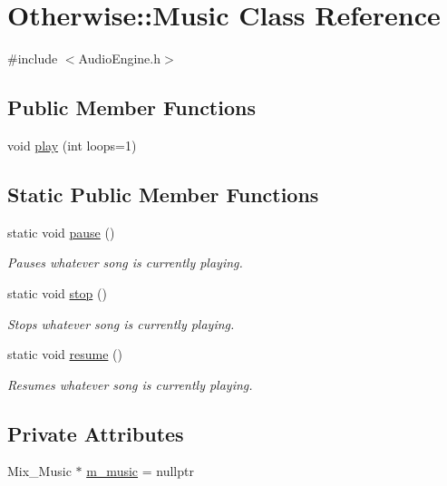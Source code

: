 \hypertarget{class_otherwise_1_1_music}{}\section{Otherwise\+:\+:Music Class Reference}
\label{class_otherwise_1_1_music}


{\ttfamily \#include $<$Audio\+Engine.\+h$>$}

\subsection*{Public Member Functions}
\begin{DoxyCompactItemize}
\item 
void \hyperlink{class_otherwise_1_1_music_a18aef6a70fa7bc14c92b17792a148828}{play} (int loops=1)
\end{DoxyCompactItemize}
\subsection*{Static Public Member Functions}
\begin{DoxyCompactItemize}
\item 
static void \hyperlink{class_otherwise_1_1_music_a95dfdf673ae0906c60cc5dee2047154c}{pause} ()
\begin{DoxyCompactList}\small\item\em Pauses whatever song is currently playing. \end{DoxyCompactList}\item 
static void \hyperlink{class_otherwise_1_1_music_a31706d4346de50bf724da0157485d8bf}{stop} ()
\begin{DoxyCompactList}\small\item\em Stops whatever song is currently playing. \end{DoxyCompactList}\item 
static void \hyperlink{class_otherwise_1_1_music_a6d4a1afb589d1e03a92bc89f1be520b9}{resume} ()
\begin{DoxyCompactList}\small\item\em Resumes whatever song is currently playing. \end{DoxyCompactList}\end{DoxyCompactItemize}
\subsection*{Private Attributes}
\begin{DoxyCompactItemize}
\item 
Mix\+\_\+\+Music $\ast$ \hyperlink{class_otherwise_1_1_music_aef72ab0f5a928a12ac16c0f0e8e1e1b7}{m\+\_\+music} = nullptr
\end{DoxyCompactItemize}
